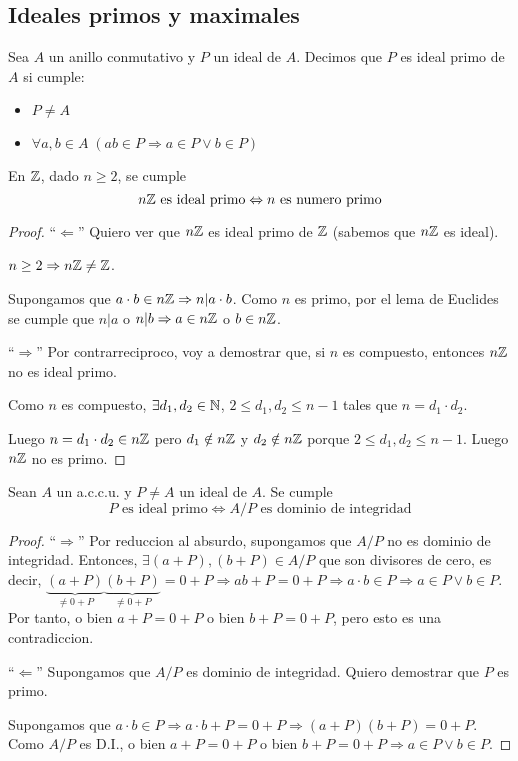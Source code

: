 \subsection{Ideales primos y maximales}
\begin{definition}
	Sea \(A \) un anillo conmutativo y \(P  \) un ideal de \(A \). Decimos que \(P \) es ideal primo de \(A \) si cumple:
	\begin{itemize}
		\item \(P \neq A \)
		\item \(\forall a,b \in A \; (ab \in P \Rightarrow a \in P \vee  b \in P )\)
	\end{itemize}
\end{definition}
\begin{proposition}
	En \(\mathbb{Z} \), dado \(n \geq 2 \), se cumple
	\[
		n\mathbb{Z} \text{ es ideal primo} \Leftrightarrow n \text{ es numero primo}
	\]
\end{proposition}
\begin{proof}
	``\(\Leftarrow\)'' Quiero ver que \(n\mathbb{Z} \) es ideal primo de \(\mathbb{Z} \) (sabemos que \(n\mathbb{Z} \) es ideal).
	
	\(n \geq  2 \Rightarrow n \mathbb{Z} \neq \mathbb{Z} \).
	
	Supongamos que \(a \cdot b \in n \mathbb{Z} \Rightarrow n | a \cdot b\). Como \(n \) es primo, por el lema de Euclides se cumple que \(n | a \) o \(n | b \Rightarrow a \in n \mathbb{Z} \) o \(b \in n\mathbb{Z} \).
	
	``\(\Rightarrow \)'' Por contrarreciproco, voy a demostrar que, si \(n \) es compuesto, entonces \(n\mathbb{Z} \) no es ideal primo.
	
	Como \(n \) es compuesto, \(\exists d_1, d_2 \in \mathbb{N} \), \(2 \leq d_1,d_2 \leq n- 1 \) tales que \(n = d_1 \cdot d_2 \).
	
	Luego \(n = d_1 \cdot d_2 \in n\mathbb{Z} \) pero \(d_1 \notin n\mathbb{Z} \) y \(d_2 \notin n\mathbb{Z} \) porque \(2 \leq d_1, d_2 \leq n -1 \). Luego \(n\mathbb{Z} \) no es primo.
\end{proof}
\begin{proposition}
	\label{idealprimonz}
	Sean \(A \) un a.c.c.u. y \(P \neq A \) un ideal de \(A \). Se cumple
	\[
		P \text{ es ideal primo} \iff A / P \text{ es dominio de integridad}
	\]
\end{proposition}
\begin{proof}
	``\(\Rightarrow \)'' Por reduccion al absurdo, supongamos que \(A / P \) no es dominio de integridad. Entonces, \( \exists (a + P), (b + P ) \in A / P \) que son divisores de cero, es decir, \(\underbrace{(a + P)}_{\neq 0 + P }\underbrace{(b + P)}_{\neq 0 + P} = 0 + P \Rightarrow ab + P = 0 + P \Rightarrow a \cdot b \in P \Rightarrow a \in P \vee b \in P\). Por tanto, o bien \(a + P = 0 + P \) o bien \(b + P = 0 + P \), pero esto es una contradiccion.
	
	``\(\Leftarrow \)'' Supongamos que \(A / P \) es dominio de integridad. Quiero demostrar que \(P \) es primo.
	
	Supongamos que \(a \cdot b \in P \Rightarrow a \cdot b + P = 0 + P \Rightarrow (a + P )(b + P) = 0 + P \). Como \(A / P \) es D.I., o bien \(a + P = 0 + P \) o bien \(b + P = 0 + P \Rightarrow a \in P \vee b \in P\).
\end{proof}
